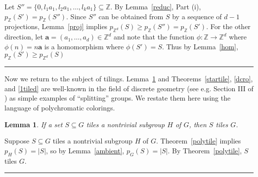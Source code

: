 \documentclass[12pt]{article}
\newenvironment{proof}{{\bf Proof:  }}{\hfill\rule{2mm}{2mm}}
\newtheorem{lemma}[theorem]{Lemma}
\newcommand{\Z}{\ensuremath{\mathbb Z}}
\newcommand{\vect}[1]{\bm{#1}}
\begin{document}
\begin{proof}
Let $S'' =  \{0, l_1a_1, l_2a_1, \ldots, l_ka_1\} \subseteq \Z$.  By Lemma~\ref{reduc}, Part (i), $p_{\Z}(S') = p_{\Z}(S'')$.  Since $S''$ can be obtained from $S$ by a sequence of $d-1$ projections, Lemma~\ref{proj} implies $p_{\Z^d}(S) \ge p_{\Z}(S'')= p_{\Z}(S')$.  For the other direction, let $\vect{a} = (a_1,\ldots, a_d) \in \Z^d$ and note that the function $\phi : \Z \to \Z^d$ where $\phi(n) = n\vect{a}$ is a homomorphism where $\phi(S') = S$.  Thus by Lemma~\ref{hom},  $p_{\Z}(S') \ge p_{\Z^d}(S)$
%
\end{proof}

Now we return to the subject of tilings.  Lemma~\ref{subgroup} and Theorems~\ref{startile}, \ref{dcro}, and \ref{1tiled} are well-known in the field of discrete geometry (see e.g. Section III of \cite{St86}) as simple examples of ``splitting'' groups. We restate them here using the language of polychromatic colorings.

\begin{lemma}\label{subgroup}
If a set $S\subseteq G$ tiles a nontrivial subgroup $H$ of $G$, then $S$ tiles $G$.
\end{lemma}

\begin{proof}
Suppose $S\subseteq G$ tiles a nontrivial subgroup $H$ of $G$. Theorem~\ref{polytile} implies $p_H(S) = |S|$, so by Lemma~\ref{ambient}, $p_G(S) = |S|$.  By Theorem~\ref{polytile}, $S$ tiles $G$.
\end{proof}
\end{document}
